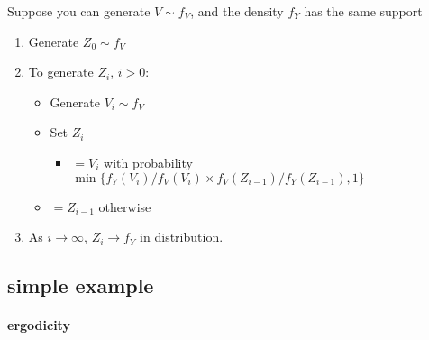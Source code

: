      Suppose you can generate $V \sim f_V$, and the density $f_Y$
     has the same support
\begin{enumerate}
\item Generate $Z_0 \sim f_V$
\item To generate $Z_i$, $i > 0$:
\begin{itemize}
\item Generate $V_i \sim f_V$
\item Set $Z_i$
\begin{itemize}
\item $= V_i$ with probability $\min\{ f_Y(V_i)/ f_V(V_i)
            \times f_V(Z_{i-1}) / f_Y(Z_{i-1}), 1\}$
\end{itemize}
\item $= Z_{i-1}$ otherwise
\end{itemize}
\item As $i \to \infty$, $Z_i \to f_Y$ in distribution.
\end{enumerate}
\subsection{simple example}
\label{sec-3-2}
\paragraph{ergodicity}
\label{sec-3-2-1}


